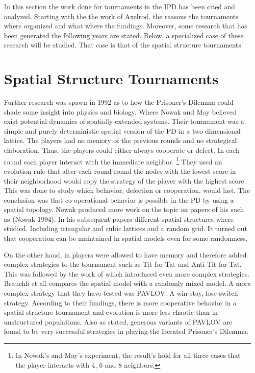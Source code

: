 In this section the work done for tournaments in the IPD has been cited and analyzed.
Starting with the the work of Axelrod, the reasons the tournaments where organized
and what where the fundings. Moreover, some research that has been generated the following
years are stated. Below, a specialized case of these research will be studied. That
case is that of the spatial structure tournaments.

\section{Spatial Structure Tournaments}

Further research was spawn in 1992 as to how the Prisoner's Dilemma could shade
some insight into physics and biology. Where Nowak and May believed exist potential
dynamics of spatially extended systems. Their tournament was a simple and purely
deterministic spatial version of the PD in a two dimensional lattice. The
players had no memory of the previous rounds and no strategical elaboration.
Thus, the players could either always cooperate or defect. In each round each
player interact with the immediate neighbor. \footnote{In Nowak's and May's
experiment, the result's hold for all three cases that  the player interacts with
4, 6 and 8 neighbors.} They used an evolution rule that after each round
round the nodes with the lowest score in their neighborhood would copy the
strategy of the player with the highest score. This was done to study which
behavior, defection or cooperation, would last. The conclusion was that co-operational
behavior is possible in the PD by using a spatial topology. Nowak produced more
work on the topic on papers of his such as \cite{Nowak1993} (Nowak 1994).
In his subsequent papers different spatial structures
where studied. Including triangular and cubic lattices and a random grid.
It turned out that cooperation can be maintained in spatial models even
for some randomness.

On the other hand,  in \cite{Lindgren1994} players were allowed to have
memory and therefore added complex strategies to the tournament such as Tit for
Tat and  Anti Tit for Tat. This was followed  by the work of
\cite{Brauchli1999} which introduced even more complex strategies. Brauchli et
all compares the spatial model with a randomly mixed model.
A more complex strategy that they have tested was PAVLOV. A win-stay,
lose-switch strategy.  According to their
fundings, there is more cooperative behavior in a spatial structure tournament
and evolution is more less chaotic than in unstructured populations. Also as
stated, generous variants of PAVLOV are found to be very successful
strategies in playing the Iterated Prisoner's Dilemma.

